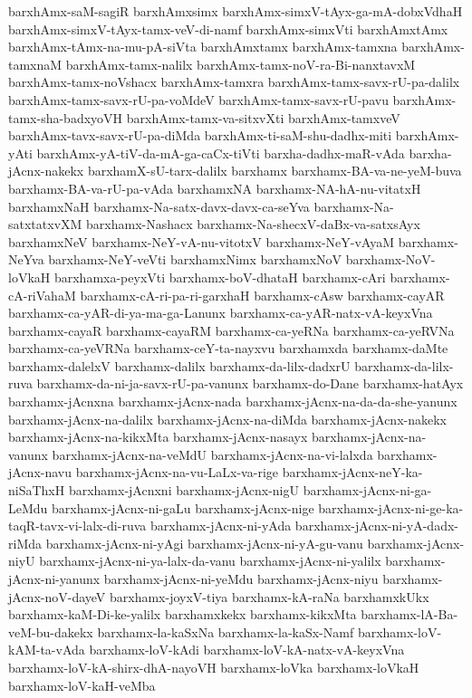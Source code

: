 {barxhAmx-saM-sagiR
barxhAmxsimx
barxhAmx-simxV-tAyx-ga-mA-dobxVdhaH
barxhAmx-simxV-tAyx-tamx-veV-di-namf
barxhAmx-simxVti
barxhAmxtAmx
barxhAmx-tAmx-na-mu-pA-siVta
barxhAmxtamx
barxhAmx-tamxna
barxhAmx-tamxnaM
barxhAmx-tamx-nalilx
barxhAmx-tamx-noV-ra-Bi-nanxtavxM
barxhAmx-tamx-noVshacx
barxhAmx-tamxra
barxhAmx-tamx-savx-rU-pa-dalilx
barxhAmx-tamx-savx-rU-pa-voMdeV
barxhAmx-tamx-savx-rU-pavu
barxhAmx-tamx-sha-badxyoVH
barxhAmx-tamx-va-sitxvXti
barxhAmx-tamxveV
barxhAmx-tavx-savx-rU-pa-diMda
barxhAmx-ti-saM-shu-dadhx-miti
barxhAmx-yAti
barxhAmx-yA-tiV-da-mA-ga-caCx-tiVti
barxha-dadhx-maR-vAda
barxha-jAcnx-nakekx
barxhamX-sU-tarx-dalilx
barxhamx
barxhamx-BA-va-ne-yeM-buva
barxhamx-BA-va-rU-pa-vAda
barxhamxNA
barxhamx-NA-hA-nu-vitatxH
barxhamxNaH
barxhamx-Na-satx-davx-davx-ca-seYva
barxhamx-Na-satxtatxvXM
barxhamx-Nashacx
barxhamx-Na-shecxV-daBx-va-satxsAyx
barxhamxNeV
barxhamx-NeY-vA-nu-vitotxV
barxhamx-NeY-vAyaM
barxhamx-NeYva
barxhamx-NeY-veVti
barxhamxNimx
barxhamxNoV
barxhamx-NoV-loVkaH
barxhamxa-peyxVti
barxhamx-boV-dhataH
barxhamx-cAri
barxhamx-cA-riVahaM
barxhamx-cA-ri-pa-ri-garxhaH
barxhamx-cAsw
barxhamx-cayAR
barxhamx-ca-yAR-di-ya-ma-ga-Lanunx
barxhamx-ca-yAR-natx-vA-keyxVna
barxhamx-cayaR
barxhamx-cayaRM
barxhamx-ca-yeRNa
barxhamx-ca-yeRVNa
barxhamx-ca-yeVRNa
barxhamx-ceY-ta-nayxvu
barxhamxda
barxhamx-daMte
barxhamx-dalelxV
barxhamx-dalilx
barxhamx-da-lilx-dadxrU
barxhamx-da-lilx-ruva
barxhamx-da-ni-ja-savx-rU-pa-vanunx
barxhamx-do-Dane
barxhamx-hatAyx
barxhamx-jAcnxna
barxhamx-jAcnx-nada
barxhamx-jAcnx-na-da-da-she-yanunx
barxhamx-jAcnx-na-dalilx
barxhamx-jAcnx-na-diMda
barxhamx-jAcnx-nakekx
barxhamx-jAcnx-na-kikxMta
barxhamx-jAcnx-nasayx
barxhamx-jAcnx-na-vanunx
barxhamx-jAcnx-na-veMdU
barxhamx-jAcnx-na-vi-lalxda
barxhamx-jAcnx-navu
barxhamx-jAcnx-na-vu-LaLx-va-rige
barxhamx-jAcnx-neY-ka-niSaThxH
barxhamx-jAcnxni
barxhamx-jAcnx-nigU
barxhamx-jAcnx-ni-ga-LeMdu
barxhamx-jAcnx-ni-gaLu
barxhamx-jAcnx-nige
barxhamx-jAcnx-ni-ge-ka-taqR-tavx-vi-lalx-di-ruva
barxhamx-jAcnx-ni-yAda
barxhamx-jAcnx-ni-yA-dadx-riMda
barxhamx-jAcnx-ni-yAgi
barxhamx-jAcnx-ni-yA-gu-vanu
barxhamx-jAcnx-niyU
barxhamx-jAcnx-ni-ya-lalx-da-vanu
barxhamx-jAcnx-ni-yalilx
barxhamx-jAcnx-ni-yanunx
barxhamx-jAcnx-ni-yeMdu
barxhamx-jAcnx-niyu
barxhamx-jAcnx-noV-dayeV
barxhamx-joyxV-tiya
barxhamx-kA-raNa
barxhamxkUkx
barxhamx-kaM-Di-ke-yalilx
barxhamxkekx
barxhamx-kikxMta
barxhamx-lA-Ba-veM-bu-dakekx
barxhamx-la-kaSxNa
barxhamx-la-kaSx-Namf
barxhamx-loV-kAM-ta-vAda
barxhamx-loV-kAdi
barxhamx-loV-kA-natx-vA-keyxVna
barxhamx-loV-kA-shirx-dhA-nayoVH
barxhamx-loVka
barxhamx-loVkaH
barxhamx-loV-kaH-veMba
}
